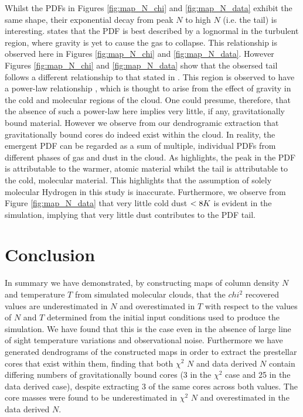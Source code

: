 \documentclass{report}
\begin{document}
Whilst the PDFs in Figures \ref{fig:map_N_chi} and \ref{fig:map_N_data} exhibit the same shape, their exponential decay from peak $N$ to high $N$ (i.e. the tail) is interesting. \textcite{tail} states that the PDF is best described by a lognormal in the turbulent region, where gravity is yet to cause the gas to collapse. This relationship is observed here in Figures \ref{fig:map_N_chi} and \ref{fig:map_N_data}. However Figures \ref{fig:map_N_chi} and \ref{fig:map_N_data} show that the obsersed tail follows a different relationship to that stated in \textcite{tail}. This region is observed to have a power-law relationship \parencite{powerlaw}, which is thought to arise from the effect of gravity in the cold and molecular regions of the cloud. One could presume, therefore, that the absence of such a power-law here implies very little, if any, gravitationally bound material. However we observe from our dendrogramic extraction that gravitationally bound cores do indeed exist within the cloud. In reality, the emergent PDF can be regarded as a sum of multiple, individual PDFs from different phases of gas and dust in the cloud. As \textcite{tail} highlights, the peak in the PDF is attributable to the warmer, atomic material whilst the tail is attributable to the cold, molecular material. This highlights that the assumption of solely molecular Hydrogen in this study is inaccurate. Furthermore, we observe from Figure \ref{fig:map_N_data} that very little cold dust $<8\/K$ is evident in the simulation, implying that very little dust contributes to the PDF tail.


\chapter{Conclusion}
In summary we have demonstrated, by constructing maps of column density $N$ and temperature $T$ from simulated molecular clouds, that the $chi^{2}$ recovered values are underestimated in $N$ and overestimated in $T$ with respect to the values of $N$ and $T$ determined from the initial input conditions used to produce the simulation. We have found that this is the case even in the absence of large line of sight temperature variations and observational noise. Furthermore we have generated dendrograms of the constructed maps in order to extract the prestellar cores that exist within them, finding that both $\chi^{2}$ $N$ and data derived $N$ contain differing numbers of gravitationally bound cores (3 in the $\chi^{2}$ case and 25 in the data derived case), despite extracting 3 of the same cores across both values. The core masses were found to be underestimated in $\chi^{2}$ $N$ and overestimated in the data derived $N$.
\end{document}
